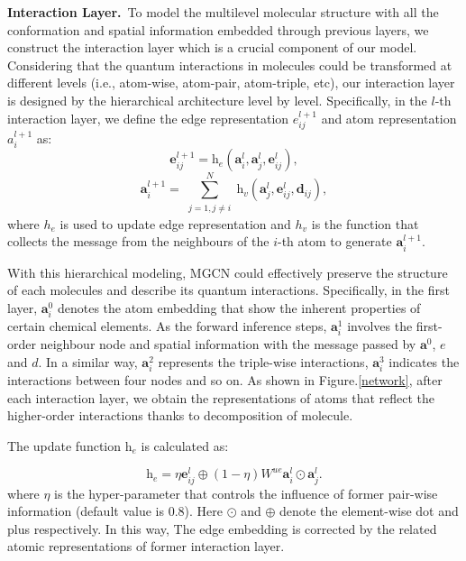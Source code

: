 \documentclass[letterpaper]{article} \usepackage{bm}
\begin{document}
\textbf{Interaction Layer.}\ To model the multilevel molecular structure with all the conformation and spatial information embedded through previous layers, we construct the interaction layer which is a crucial component of our model. Considering that the quantum interactions in molecules could be transformed at different levels (i.e., atom-wise, atom-pair, atom-triple, etc), our interaction layer is designed by the hierarchical architecture level by level. Specifically, in the $l$-th interaction layer, we define the edge representation $e_{ij}^{l+1}$ and atom representation $a^{l+1}_i$ as:
 \begin{equation}\bm{e}^{l+1}_{ij} = \mathrm{h}_{e}(\bm{a}_i^l, \bm{a}_j^l, \bm{e}^l_{ij}), \end{equation}   
  \begin{equation}\bm{a}^{l+1}_i = \sum_{\substack{j=1, j\neq i}}^N \mathrm{h}_{v}(\bm{a}^l_j, \bm{e}^l_{ij}, \bm{d}_{ij}), \end{equation}   
where $h_e$ is used to update edge representation and $h_v$ is the function that collects the message from the neighbours of the $i$-th atom to generate $\bm{a}_i^{l+1}$. 

With this hierarchical modeling, MGCN could effectively preserve the structure of each molecules and describe its quantum interactions. Specifically, in the first layer, $\bm{a}^0_i$ denotes the atom embedding that show the inherent properties of certain chemical elements. As the forward inference steps, $\bm{a}^1_{i}$ involves the first-order neighbour node and spatial information with the message passed by $\bm{a}^0$, $e$ and $d$. In a similar way, $\bm{a}^2_{i}$ represents the triple-wise interactions, $\bm{a}^3_{i}$ indicates the interactions between four nodes and so on. As shown in Figure.\ref{network}, after each interaction layer, we obtain the representations of atoms that reflect the higher-order interactions thanks to decomposition of molecule. 


The update function $\mathrm{h}_e$ is calculated as:  

  \begin{equation} 
\mathrm{h}_e = \eta \bm{e}^l_{ij} \oplus (1 - \eta)W^{ue} \bm{a}^{l}_i\odot\bm{a}^{l}_j. \end{equation} where $\eta$ is the hyper-parameter that controls the influence of former pair-wise information (default value is 0.8). Here $\odot$ and $\oplus$ denote the element-wise dot and plus respectively. In this way, The edge embedding is corrected by the related atomic representations of former interaction layer.
\end{document}
